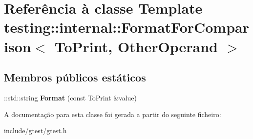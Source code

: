 \hypertarget{classtesting_1_1internal_1_1FormatForComparison}{\section{Referência à classe Template testing\-:\-:internal\-:\-:Format\-For\-Comparison$<$ To\-Print, Other\-Operand $>$}
\label{classtesting_1_1internal_1_1FormatForComparison}
}
\subsection*{Membros públicos estáticos}
\begin{DoxyCompactItemize}
\item 
\hypertarget{classtesting_1_1internal_1_1FormatForComparison_a2aeb688fc55b57abd3021d82eccad896}{\-::std\-::string {\bfseries Format} (const To\-Print \&value)}\label{classtesting_1_1internal_1_1FormatForComparison_a2aeb688fc55b57abd3021d82eccad896}

\end{DoxyCompactItemize}


A documentação para esta classe foi gerada a partir do seguinte ficheiro\-:\begin{DoxyCompactItemize}
\item 
include/gtest/gtest.\-h\end{DoxyCompactItemize}
